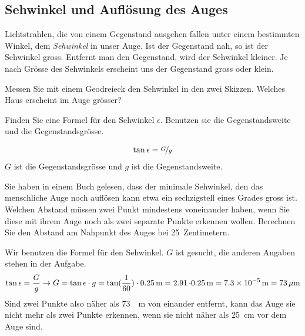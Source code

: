 \documentclass[12pt,a4paper,twoside]{article}
\begin{document}
\subsection{Sehwinkel und Auflösung des Auges}
Lichtstrahlen, die von einem Gegenstand ausgehen fallen unter einem bestimmten Winkel, dem \emph{Sehwinkel} in unser Auge.
Ist der Gegenstand nah, so ist der Sehwinkel gross. Entfernt man den Gegenstand, wird der Sehwinkel kleiner.
Je nach Grösse des Sehwinkels erscheint uns der Gegenstand gross oder klein.

\begin{aufgabe}
	Messen Sie mit einem Geodreieck den Sehwinkel in den zwei Skizzen. Welches Haus erscheint im Auge grösser?
\begin{center}
\end{center}
\end{aufgabe}

\begin{aufgabe}
	Finden Sie eine Formel für den Sehwinkel $\epsilon$. Benutzen sie die Gegenstandsweite und die Gegenstandsgrösse.
	\begin{loesung}
		\begin{eqnarray*}
			\tan\epsilon = \nicefrac{G}{g}
		\end{eqnarray*}
		$G$ ist die Gegenstandsgrösse und $g$ ist die Gegenstandsweite.
	\end{loesung}
\end{aufgabe}

\begin{aufgabe}
	\label{zweiPunkte}
	Sie haben in einem Buch gelesen, dass der minimale Sehwinkel, den das menschliche Auge noch auflösen kann etwa ein sechzigstell eines Grades gross ist.
	Welchen Abstand müssen zwei Punkt mindestens voneinander haben, wenn Sie diese mit ihrem Auge noch als zwei separate Punkte erkennen wollen. 
	Berechnen Sie den Abstand am Nahpunkt des Auges bei \SI{25}{Zentimetern}.
	\begin{loesung}
		Wir benutzen die Formel für den Sehwinkel. $G$ ist gesucht, die anderen Angaben stehen in der Aufgabe.
		\begin{eqnarray*}
			\tan\epsilon = \frac{G}{g}\to G=\tan\epsilon\cdot g=\tan(\frac{1}{60})\cdot\SI{0.25}{m}=\SI{2.91}\cdot\SI{0.25}{m}=\SI{7.3E-5}{m}=\SI{73}{\mu m}
		\end{eqnarray*}
		Sind zwei Punkte also näher als \SI{73}{\mu m} von einander entfernt, 
		kann das Auge sie nicht mehr als zwei Punkte erkennen, wenn sie nicht näher als \SI{25}{cm} vor dem Auge sind.
	\end{loesung}
\end{aufgabe}
\end{document}
